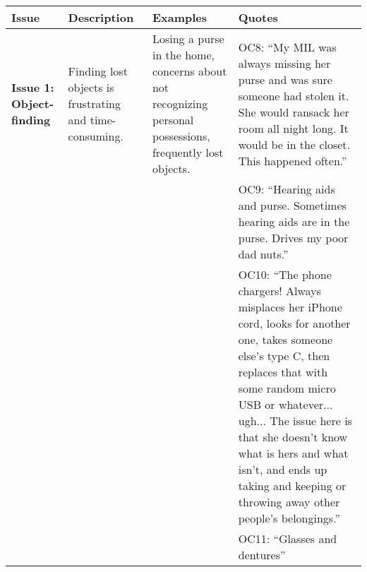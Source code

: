 \begin{table*}
\centering
\begin{tabular}{|l|p{3cm}|p{4cm}|p{6cm}|}
\hline
\textbf{Issue} & \textbf{Description} & \textbf{Examples} & \textbf{Quotes} \\ \hline
\textbf{Issue 1: Object-finding} & Finding lost objects is frustrating and time-consuming. & Losing a purse in the home, concerns about not recognizing personal possessions, frequently lost objects. & OC8: ``My MIL was always missing her purse and was sure someone had stolen it. She would ransack her room all night long. It would be in the closet. This happened often.'' \\
& & & OC9: ``Hearing aids and purse. Sometimes hearing aids are in the purse. Drives my poor dad nuts.'' \\
& & & OC10: ``The phone chargers! Always misplaces her iPhone cord, looks for another one, takes someone else's type C, then replaces that with some random micro USB or whatever... ugh... The issue here is that she doesn't know what is hers and what isn't, and ends up taking and keeping or throwing away other people's belongings.'' \\
& & & OC11: ``Glasses and dentures'' \\ \hline


\end{tabular}
\end{table*}
